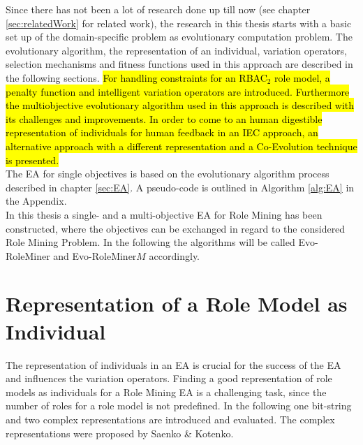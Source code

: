 Since there has not been a lot of research done up till now (see chapter \ref{sec:relatedWork} for related work), the research in this thesis starts with a basic set up of the domain-specific problem as evolutionary computation problem. The evolutionary algorithm, the representation of an individual, variation operators, selection mechanisms and fitness functions used in this approach are described in the following sections. \hl{For handling constraints for an RBAC$_2$ role model, a penalty function and intelligent variation operators are introduced. Furthermore the multiobjective evolutionary algorithm used in this approach is described with its challenges and improvements. In order to come to an human digestible representation of individuals for human feedback in an IEC approach, an alternative approach with a different representation and a Co-Evolution technique is presented.}\\
The EA for single objectives is based on the evolutionary algorithm process described in chapter \ref{sec:EA}. A pseudo-code is outlined in Algorithm \ref{alg:EA} in the Appendix.\\
In this thesis a single- and a multi-objective EA for Role Mining has been constructed, where the objectives can be exchanged in regard to the considered Role Mining Problem. In the following the algorithms will be called Evo-RoleMiner and Evo-RoleMiner$M$ accordingly.
    
    \section{Representation of a Role Model as Individual}
    The representation of individuals in an EA is crucial for the success of the EA and influences the variation operators. Finding a good representation of role models as individuals for a Role Mining EA is a challenging task, since the number of roles for a role model is not predefined. In the following one bit-string and two complex representations are introduced and evaluated. The complex representations were proposed by Saenko \& Kotenko\cite{saenko2012design}.
